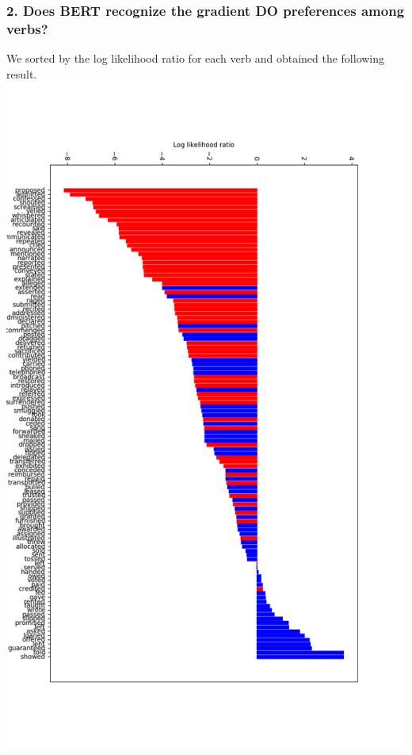\documentclass[twocolumn,dvipdfmx, 10pt]{article}
\begin{document}
\subsubsection*{2. Does BERT recognize the gradient DO preferences among verbs?}
We sorted by the log likelihood ratio for each verb and obtained the following result.\\
\includegraphics[keepaspectratio,width = \linewidth]{BERT_individual.png}
\end{document}
